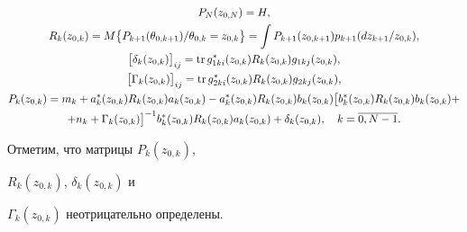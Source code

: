 \begin{gather}


P_{N}(z_{0,N})=H,\notag\\


%


R_{k}(z_{0,k})=M\bigl\{P_{k+1}(\theta_{0,k+1})/\theta_{0,k}=z_{0,k}


\bigr\}=


\int P_{k+1}(z_{0,k+1})p_{k+1}(dz_{k+1}/z_{0,k}),\notag\\


%


\bigl[\delta_{k}(z_{0,k})\bigr]_{ij}=\tr g_{1ki}^{*}(z_{0,k})R_{k}(z_{0,k})


g_{1kj}(z_{0,k}),\notag\\


%


\bigl[\Gamma_{k}(z_{0,k})\bigr]_{ij}=\tr g_{2ki}^{*}(z_{0,k})R_{k}(z_{0,k})


g_{2kj}(z_{0,k}),\notag\\


%


P_{k}(z_{0,k})=m_{k}+


a_{k}^{*}(z_{0,k})R_{k}(z_{0,k})a_{k}(z_{0,k})-


a_{k}^{*}(z_{0,k})R_{k}(z_{0,k})


b_{k}(z_{0,k})


\bigl[b_{k}^{*}(z_{0,k})R_{k}(z_{0,k})


b_{k}(z_{0,k})+\notag\\


+n_{k}+\Gamma_{k}(z_{0,k})\bigr]^{-1}


b_{k}^{*}(z_{0,k})R_{k}(z_{0,k})


a_{k}(z_{0,k})+\delta_{k}(z_{0,k}),\quad


k=\overline{0,N-1}.


\end{gather}


Отметим, что матрицы $P_{k}(z_{0,k})$,


$R_{k}(z_{0,k})$, $\delta_{k}(z_{0,k})$ и


$\Gamma_{k}(z_{0,k})$ неотрицательно определены.





